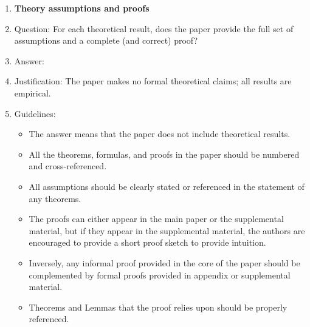 \begin{enumerate}
\begin{itemize}
        \item The authors should discuss the computational efficiency of the proposed algorithms and how they scale with dataset size.
        \item If applicable, the authors should discuss possible limitations of their approach to address problems of privacy and fairness.
        \item While the authors might fear that complete honesty about limitations might be used by reviewers as grounds for rejection, a worse outcome might be that reviewers discover limitations that aren't acknowledged in the paper. The authors should use their best judgment and recognize that individual actions in favor of transparency play an important role in developing norms that preserve the integrity of the community. Reviewers will be specifically instructed to not penalize honesty concerning limitations.
    \end{itemize}

\item {\bf Theory assumptions and proofs}
    \item[] Question: For each theoretical result, does the paper provide the full set of assumptions and a complete (and correct) proof?
    \item[] Answer: \answerNA{}
    \item[] Justification: The paper makes no formal theoretical claims; all results are empirical.
    \item[] Guidelines:
    \begin{itemize}
        \item The answer \answerNA{} means that the paper does not include theoretical results.
        \item All the theorems, formulas, and proofs in the paper should be numbered and cross-referenced.
        \item All assumptions should be clearly stated or referenced in the statement of any theorems.
        \item The proofs can either appear in the main paper or the supplemental material, but if they appear in the supplemental material, the authors are encouraged to provide a short proof sketch to provide intuition.
        \item Inversely, any informal proof provided in the core of the paper should be complemented by formal proofs provided in appendix or supplemental material.
        \item Theorems and Lemmas that the proof relies upon should be properly referenced.
    \end{itemize}


\end{enumerate}
